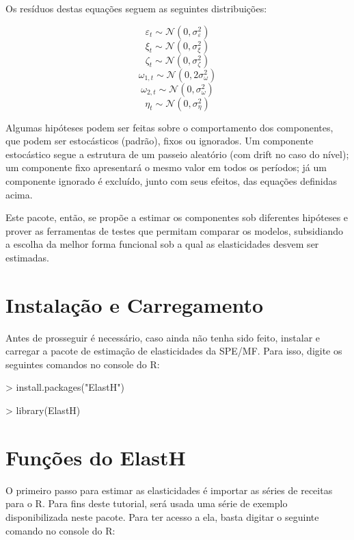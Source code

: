 \documentclass[11pt,a4paper,oneside]{report}
\begin{document}
Os resíduos destas equações seguem as seguintes distribuições: 

\[\varepsilon_t \sim \mathcal{N}(0, \sigma^2_\varepsilon)\]
\[\xi_t \sim \mathcal{N}(0, \sigma^2_\xi)\]
\[\zeta_t \sim \mathcal{N}(0, \sigma^2_\zeta)\]
\[\omega_{1,t} \sim \mathcal{N}(0, 2\sigma^2_\omega)\]
\[\omega_{2,t} \sim \mathcal{N}(0, \sigma^2_\omega)\]
\[\eta_t \sim \mathcal{N}(0, \sigma^2_\eta)\]

Algumas hipóteses podem ser feitas sobre o comportamento dos componentes, que
podem ser estocásticos (padrão), fixos ou ignorados. Um componente estocástico
segue a estrutura de um passeio aleatório (com drift no caso do nível); um
componente fixo apresentará o mesmo valor em todos os períodos; já um componente ignorado
é excluído, junto com seus efeitos, das equações definidas acima.

Este pacote, então, se propõe a estimar os componentes sob diferentes hipóteses
e prover as ferramentas de testes que permitam comparar os modelos, subsidiando a
escolha da melhor forma funcional sob a qual as elasticidades desvem ser estimadas. 

\section*{Instalação e Carregamento}

Antes de prosseguir é necessário, caso ainda não tenha sido feito, instalar e
carregar a pacote de estimação de elasticidades da SPE/MF. Para isso, digite os
seguintes comandos no console do R:

\begin{Schunk}
\begin{Sinput}
> install.packages("ElastH")
\end{Sinput}
\end{Schunk}
\begin{Schunk}
\begin{Sinput}
> library(ElastH)
\end{Sinput}
\end{Schunk}

\section*{Funções do ElastH}

O primeiro passo para estimar as elasticidades é importar as séries de
receitas para o R. Para fins deste tutorial, será usada uma série de exemplo
disponibilizada neste pacote. Para ter acesso a ela, basta digitar o seguinte
comando no console do R:
\end{document}
